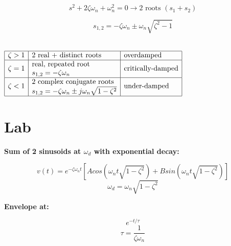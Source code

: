 \documentclass[10pt]{report}
\begin{document}
\begin{equation} s^2 + 2\zeta \omega_n + \omega_n^2 = 0 \longrightarrow 2 \text{ roots } (s_1 + s_2) \end{equation}

\begin{equation} s_{1,2} = -\zeta \omega_n \pm \omega_n \sqrt{\zeta^2 - 1} \end{equation} \\

\begin{center}
$\begin{array}{|l|l|l|} 
\hline
\zeta > 1 & 2 \text{ real + distinct roots} &  \text{overdamped} \\ \hline
\multirow{2}{*}{$\zeta = 1$} & \text{real, repeated root} & \multirow{2}{*}{critically-damped} \\ 
& s_{1,2} = -\zeta \omega_n & \\ \hline
\multirow{2}{*}{$\zeta < 1$} & 2 \text{ complex conjugate roots} &  \multirow{2}{*}{under-damped}\\
& s_{1,2} = -\zeta \omega_n \pm j \omega_n \sqrt{1 - \zeta^2} &  \\ \hline


\end{array}$
\end{center}

\pagebreak

\section*{Lab}

{\bf Sum of 2 sinusoids at $\omega_d$ with exponential decay: }

\begin{equation} v(t) = e^{-\zeta \omega_n t} \left[ Acos\left(\omega_n t \sqrt{1 - \zeta^2} \right) + B sin \left( \omega_n t \sqrt{1 - \zeta^2} \right) \right] \end{equation}
\begin{equation} \omega_d = \omega_n \sqrt{1 - \zeta^2} \end{equation}

{\bf Envelope at:}

\begin{equation} e^{-t/\tau} \end{equation}
\begin{equation} \tau = \dfrac{1}{\zeta \omega_n} \end{equation}
\end{document}
